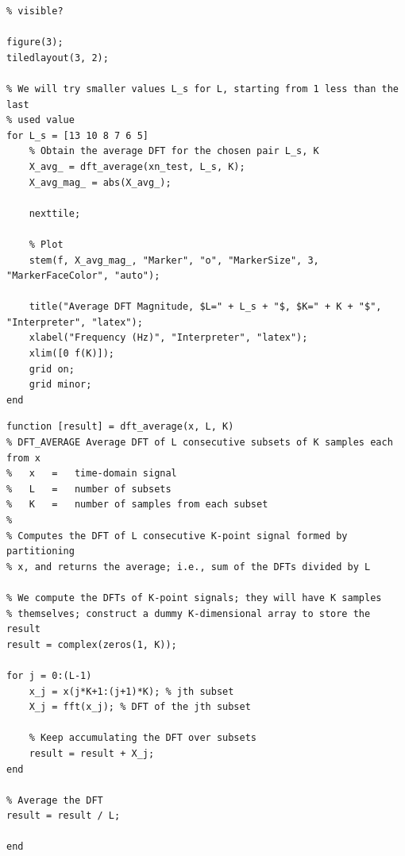\documentclass{article}[a4paper]
\begin{document}
\begin{lstlisting}[caption={Main Code}, label=harmonic_main]
% 3.1.5 - What is the smallest value of L such that the peaks remain
% visible?

figure(3);
tiledlayout(3, 2);

% We will try smaller values L_s for L, starting from 1 less than the last
% used value
for L_s = [13 10 8 7 6 5]
	% Obtain the average DFT for the chosen pair L_s, K
	X_avg_ = dft_average(xn_test, L_s, K);
	X_avg_mag_ = abs(X_avg_);
	
	nexttile;
	
	% Plot
	stem(f, X_avg_mag_, "Marker", "o", "MarkerSize", 3, "MarkerFaceColor", "auto");
	
	title("Average DFT Magnitude, $L=" + L_s + "$, $K=" + K + "$", "Interpreter", "latex");
	xlabel("Frequency (Hz)", "Interpreter", "latex");
	xlim([0 f(K)]);
	grid on;
	grid minor;
end
	\end{lstlisting}
	
	\begin{lstlisting}[caption={DFT averaging}, label=dft_avg_code]
function [result] = dft_average(x, L, K)
% DFT_AVERAGE Average DFT of L consecutive subsets of K samples each from x
%   x   =   time-domain signal
%   L   =   number of subsets
%   K   =   number of samples from each subset
%
% Computes the DFT of L consecutive K-point signal formed by partitioning
% x, and returns the average; i.e., sum of the DFTs divided by L

% We compute the DFTs of K-point signals; they will have K samples
% themselves; construct a dummy K-dimensional array to store the result
result = complex(zeros(1, K));

for j = 0:(L-1)
	x_j = x(j*K+1:(j+1)*K); % jth subset
	X_j = fft(x_j); % DFT of the jth subset
	
	% Keep accumulating the DFT over subsets
	result = result + X_j;
end

% Average the DFT
result = result / L;

end
	\end{lstlisting}
	
\end{document}
